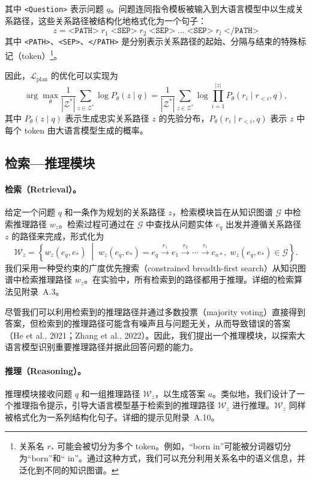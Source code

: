 \documentclass[11pt,UTF8,fontset=fandol]{ctexart}
\begin{document}
其中 \texttt{<Question>} 表示问题 $q$。问题连同指令模板被输入到大语言模型中以生成关系路径，这些关系路径被结构化地格式化为一个句子：
\[
z = \texttt{<PATH>}\; r_1\; \texttt{<SEP>}\; r_2\; \texttt{<SEP>}\; \ldots\; \texttt{<SEP>}\; r_l\; \texttt{</PATH>}
\]
其中 \texttt{<PATH>}、\texttt{<SEP>}、\texttt{</PATH>} 是分别表示关系路径的起始、分隔与结束的特殊标记（token）\footnote{关系名 $r_*$ 可能会被切分为多个 token。例如，“born in”可能被分词器切分为“born”和“ in”。通过这种方式，我们可以充分利用关系名中的语义信息，并泛化到不同的知识图谱。}。

因此，$\mathcal{L}_{\text{plan}}$ 的优化可以实现为
\begin{equation}
\arg\max_\theta \frac{1}{|\mathcal{Z}^*|} \sum_{z \in \mathcal{Z}^*} \log P_\theta(z \mid q) = \frac{1}{|\mathcal{Z}^*|} \sum_{z \in \mathcal{Z}^*} \log \prod_{i=1}^{|z|} P_\theta(r_i \mid r_{<i}, q),
\end{equation}
其中 $P_\theta(z \mid q)$ 表示生成忠实关系路径 $z$ 的先验分布，$P_\theta(r_i \mid r_{<i}, q)$ 表示 $z$ 中每个 token 由大语言模型生成的概率。

\subsection{检索—推理模块}

\paragraph{检索（Retrieval）。}
给定一个问题 $q$ 和一条作为规划的关系路径 $z$，检索模块旨在从知识图谱 $\mathcal{G}$ 中检索推理路径 $w_z$。检索过程可通过在 $\mathcal{G}$ 中查找从问题实体 $e_q$ 出发并遵循关系路径 $z$ 的路径来完成，形式化为
\begin{equation}
\mathcal{W}_z = \left\{ w_z(e_q, e_*) \;\middle|\; w_z(e_q, e_*) = e_q \xrightarrow{r_1} e_1 \xrightarrow{r_2} \cdots \xrightarrow{r_l} e_{a*},\; w_z(e_q, e_*) \in \mathcal{G} \right\}.
\end{equation}
我们采用一种受约束的广度优先搜索（constrained breadth-first search）从知识图谱中检索推理路径 $w_z$。在实验中，所有检索到的路径都用于推理。详细的检索算法见附录~A.3。

尽管我们可以利用检索到的推理路径并通过多数投票（majority voting）直接得到答案，但检索到的推理路径可能含有噪声且与问题无关，从而导致错误的答案（He et al., 2021；Zhang et al., 2022）。因此，我们提出一个推理模块，以探索大语言模型识别重要推理路径并据此回答问题的能力。

\paragraph{推理（Reasoning）。}
推理模块接收问题 $q$ 和一组推理路径 $\mathcal{W}_z$，以生成答案 $a$。类似地，我们设计了一个推理指令提示，引导大语言模型基于检索到的推理路径 $\mathcal{W}_z$ 进行推理。$\mathcal{W}_z$ 同样被格式化为一系列结构化句子。详细的提示见附录~A.10。
\end{document}
